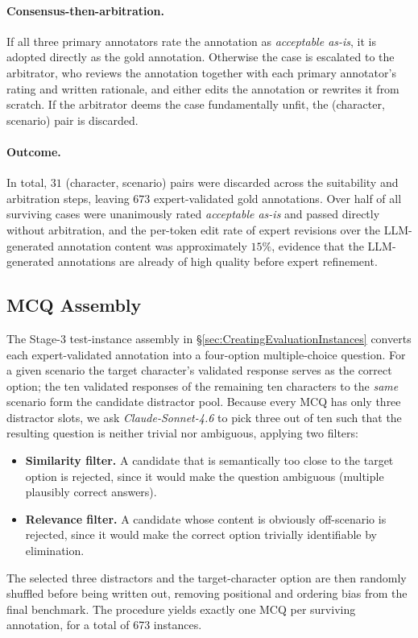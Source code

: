 \paragraph{Consensus-then-arbitration.} If all three primary annotators rate the annotation as \textit{acceptable as-is}, it is adopted directly as the gold annotation. Otherwise the case is escalated to the arbitrator, who reviews the annotation together with each primary annotator's rating and written rationale, and either edits the annotation or rewrites it from scratch. If the arbitrator deems the case fundamentally unfit, the (character, scenario) pair is discarded.

\paragraph{Outcome.} In total, $31$ (character, scenario) pairs were discarded across the suitability and arbitration steps, leaving $673$ expert-validated gold annotations. Over half of all surviving cases were unanimously rated \textit{acceptable as-is} and passed directly without arbitration, and the per-token edit rate of expert revisions over the LLM-generated annotation content was approximately $15\%$, evidence that the LLM-generated annotations are already of high quality before expert refinement.

\subsection{MCQ Assembly}
\label{app:mcq_assembly}

The Stage-3 test-instance assembly in \S\ref{sec:CreatingEvaluationInstances} converts each expert-validated annotation into a four-option multiple-choice question. For a given scenario the target character's validated response serves as the correct option; the ten validated responses of the remaining ten characters to the \emph{same} scenario form the candidate distractor pool. Because every MCQ has only three distractor slots, we ask \textit{Claude-Sonnet-4.6} to pick three out of ten such that the resulting question is neither trivial nor ambiguous, applying two filters:
\begin{itemize}[leftmargin=1.5em, itemsep=2pt]
  \item \textbf{Similarity filter.} A candidate that is semantically too close to the target option is rejected, since it would make the question ambiguous (multiple plausibly correct answers).
  \item \textbf{Relevance filter.} A candidate whose content is obviously off-scenario is rejected, since it would make the correct option trivially identifiable by elimination.
\end{itemize}
The selected three distractors and the target-character option are then randomly shuffled before being written out, removing positional and ordering bias from the final benchmark. The procedure yields exactly one MCQ per surviving annotation, for a total of 673 instances.


